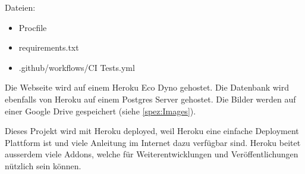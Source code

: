 Dateien:
\begin{itemize}
    \item Procfile
    \item requirements.txt
    \item .github/workflows/CI Tests.yml
\end{itemize}

Die Webseite wird auf einem Heroku Eco Dyno gehostet. Die Datenbank wird ebenfalls
von Heroku auf einem Postgres Server gehostet. Die Bilder werden auf einer
Google Drive gespeichert (siehe \ref{spez:Images}).

Dieses Projekt wird mit Heroku deployed, weil Heroku eine einfache 
Deployment Plattform ist und viele Anleitung im Internet dazu verfügbar sind.
Heroku beitet ausserdem viele Addons, welche für Weiterentwicklungen und
Veröffentlichungen nützlich sein können.
